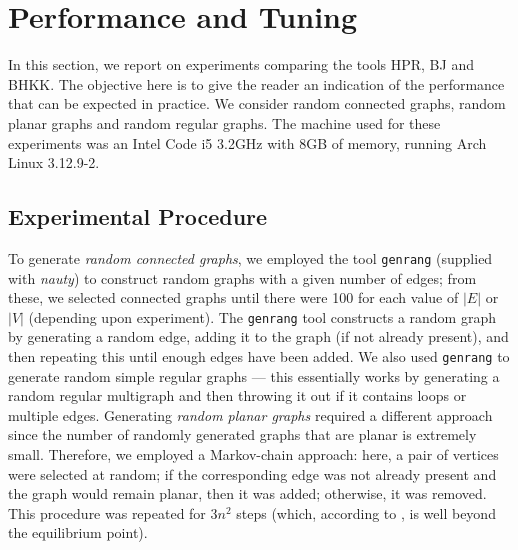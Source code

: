 

\section{Performance and Tuning}  

In this section, we report on experiments comparing the tools HPR, BJ and BHKK.  The objective here is to give the reader an indication of the performance that can be expected in practice.  We consider random connected graphs, random planar graphs and random regular graphs.  The machine used for these experiments was an Intel Code i5 3.2GHz with 8GB of memory, running Arch Linux 3.12.9-2.

\subsection{Experimental Procedure}
To generate {\em random connected graphs}, we employed the tool \verb+genrang+ (supplied with {\em nauty}) to construct random graphs with a given number of edges; from these, we selected connected graphs until there were 100 for each value of $|E|$ or $|V|$ (depending upon experiment).  The \verb+genrang+ tool constructs a random graph by generating a random edge, adding it to the graph (if not already present), and then repeating this until enough edges have been added.  We also used \verb+genrang+ to generate random simple regular graphs --- this essentially works by generating a random regular multigraph and then throwing it out if it contains loops or multiple edges.  Generating {\em random planar graphs} required a different approach since the number of randomly generated graphs that are planar is extremely small.  Therefore, we employed a Markov-chain approach:  here, a pair of vertices were selected at random; if the corresponding edge was not already present and the graph would remain planar, then it was added; otherwise, it was removed.  This procedure was repeated for $3n^2$ steps (which, according to \cite{DVW96}, is well beyond the equilibrium point).

